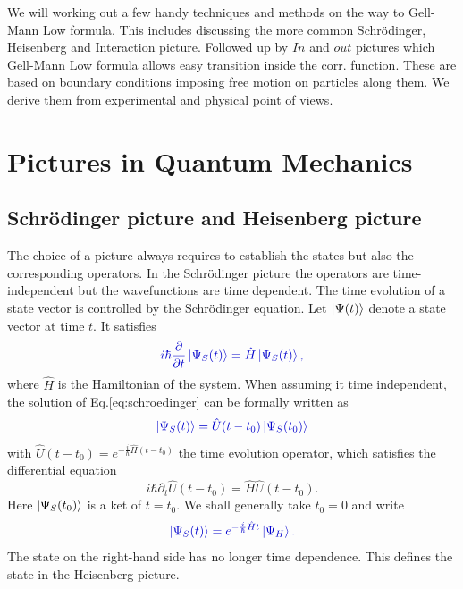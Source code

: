 \documentclass[12pt, titlepage]{article}
\begin{document}
We will working out a few handy techniques and methods on the way to Gell-Mann Low formula. This includes discussing the more common Schrödinger, Heisenberg and Interaction picture. Followed up by $ In $ and $ out $ pictures which Gell-Mann Low formula allows easy transition inside the corr. function. These are based on boundary conditions imposing free motion on particles along them. We derive them from experimental and physical point of views.
\section{Pictures in Quantum Mechanics }
\subsection{Schrödinger picture and Heisenberg picture}
The choice of a picture always requires to establish the states but also the corresponding operators. 
In the Schrödinger picture the operators are time-independent but the wavefunctions are time dependent. The time evolution of a state vector is controlled by the Schrödinger equation. Let $ \ket{\Psi(t)} $ denote a state vector at time $ t $. It satisfies
\begin{equation}\label{eq:schroedinger}
\textcolor[RGB]{0,0,204}{
i \hbar \frac{\partial }{\partial t} \ket{\Psi_{S}(t)} =
\hat{H} \ket{\Psi_{S}(t)},
}
\end{equation}
where $ \hat{H} $ is the Hamiltonian of the system. When assuming it time independent, the solution of Eq.\enskip\eqref{eq:schroedinger} can be formally written as 
\begin{equation}\label{eq:time_ev_op_schr}
\textcolor[RGB]{0,0,204}{
\ket{\Psi_{S}(t)} 
=\hat{U}(t-t_{0})\ket{\Psi_{S}(t_0)}
}
\end{equation}
with $ \hat{U}(t-t_{0}) = e^{-\frac{i}{\hbar}\hat{H}(t-t_{0})} $ the time evolution operator, which satisfies the differential equation 
\begin{equation}\label{evo_U_1}
i\hbar\partial_{t}\hat{U}(t-t_{0})=\hat{H}\hat{U}(t-t_{0})
. 
\end{equation}
 Here $ \ket{\Psi_{S}(t_0)} $ is a ket of $ t=t_{0} $. We shall generally take $ t_{0}=0 $ and write
\begin{equation}\label{eq:phi_s_and_phi_h}
\textcolor[RGB]{0,0,204}{
\ket{\Psi_{S}(t)} 
= e^{-\frac{i}{\hbar}\hat{H}t}
\ket{\Psi_{H}}.
}
\end{equation}
The state on the right-hand side has no longer time dependence. This defines the  state in the Heisenberg picture.
\end{document}

